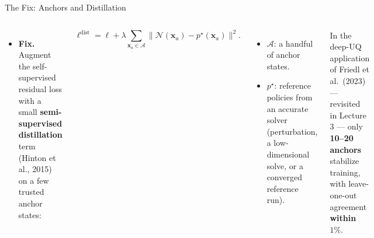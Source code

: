 \documentclass[aspectratio=169,11pt]{beamer}
\newcommand{\x}{\bm{x}}
\newcommand{\lemph}[1]{{\color{uzhblue}\bfseries #1}}
\newcommand{\gemph}[1]{{\color{vgold!75!black}\bfseries #1}}
\begin{document}
\begin{frame}[shrink=10]{The Fix: Anchors and Distillation}
\vspace*{\fill}
\begin{columns}[T,onlytextwidth]
\begin{itemize}\setlength\itemsep{2pt}
  \item \textbf{\color{uzhblue}Fix.} Augment the self-supervised residual loss with a small \lemph{semi-supervised distillation} term (Hinton et al., 2015) on a few trusted anchor states:
\end{itemize}
\[
  \ell^{\mathrm{dist}}=\ell
   +\lambda\!\sum_{\x_a\in\mathcal{A}}\!\bigl\|\mathcal{N}(\x_a)-p^\star(\x_a)\bigr\|^2 .
\]
{\footnotesize
\begin{itemize}\setlength\itemsep{2pt}
  \item $\mathcal{A}$: a handful of anchor states.
  \item $p^\star$: reference policies from an accurate solver (perturbation, a low-dimensional solve, or a converged reference run).
\end{itemize}}
\begin{recipe}[Remedy]
\footnotesize In the deep-UQ application of Friedl et al.\ (2023) --- revisited in Lecture 3 --- only \gemph{10--20 anchors} stabilize training, with leave-one-out agreement \gemph{within $1\%$}.
\end{recipe}
\end{columns}
\vspace*{\fill}
\end{frame}
\end{document}
